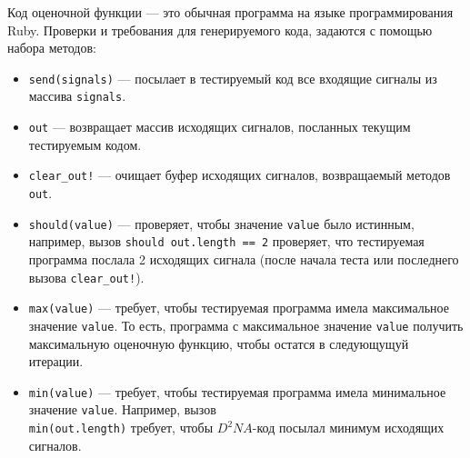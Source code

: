 \documentclass[utf8,a5paper,portrait,10pt]{eskdtext}
\begin{document}
Код оценочной функции — это обычная программа на языке программирования Ruby.
Проверки и требования для генерируемого кода, задаются с помощью набора методов:
\begin{itemize}
  \item \texttt{send(signals)} — посылает в тестируемый код все входящие сигналы
        из массива \texttt{signals}.
  \item \texttt{out} — возвращает массив исходящих сигналов, посланных текущим
        тестируемым кодом.
  \item \texttt{clear\_out!} — очищает буфер исходящих сигналов, возвращаемый
        методов \texttt{out}.
  \item \texttt{should(value)} — проверяет, чтобы значение \texttt{value} было
        истинным, например, вызов \texttt{should out.length == 2} проверяет,
        что тестируемая программа послала 2 исходящих сигнала (после начала
        теста или последнего вызова \texttt{clear\_out!}).
  \item \texttt{max(value)} — требует, чтобы тестируемая программа имела
        максимальное значение \texttt{value}. То есть, программа с максимальное
        значение \texttt{value} получить максимальную оценочную функцию, чтобы
        остатся в следующущуй итерации.
  \item \texttt{min(value)} — требует, чтобы тестируемая программа имела
        минимальное значение \texttt{value}. Например, вызов\\
        \texttt{min(out.length)} требует, чтобы $D^2NA$-код посылал минимум
        исходящих сигналов.
\end{itemize}
\end{document}
